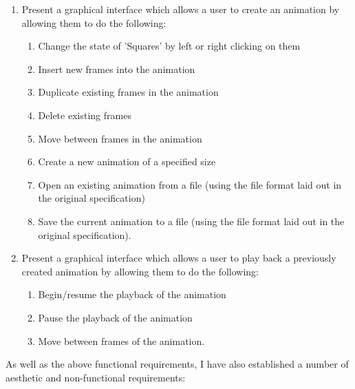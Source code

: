 \documentclass[a4paper, 11pt]{article}
\begin{document}
\begin{enumerate}
\item Present a graphical interface which allows a user to create an animation by allowing them to do the following:
\begin{enumerate}
\item Change the state of 'Squares' by left or right clicking on them
\item Insert new frames into the animation
\item Duplicate existing frames in the animation
\item Delete existing frames
\item Move between frames in the animation
\item Create a new animation of a specified size
\item Open an existing animation from a file (using the file format laid out in the original specification)
\item Save the current animation to a file (using the file format laid out in the original specification).
\end{enumerate}
\item Present a graphical interface which allows a user to play back a previously created animation by allowing them to do the following:
\begin{enumerate}
\item Begin/resume the playback of the animation
\item Pause the playback of the animation
\item Move between frames of the animation.
\end{enumerate}
\end{enumerate}

As well as the above functional requirements, I have also established a number of aesthetic and non-functional requirements:
\end{document}
